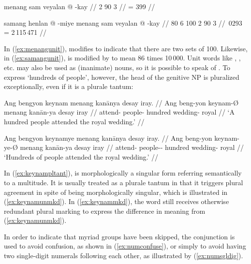 \pex[glwordalign=center]
\a\label{ex:menangunit}\begingl
	\gla menang sam veyalan @ -kay //
	 {2} {90} {3} //
	 = 399 //
\endgl

\a\label{ex:samangunit}\begingl
	\gla samang henlan @ -miye menang sam veyalan @ -kay //
	 {80} {6} {100} {2} {90} {3} //
	\,0293 = 2\,115\,471 //
\endgl

\xe

In (\ref{ex:menangunit}),  modifies  to 
indicate that there are two sets of 100. Likewise, in 
(\ref{ex:samangunit}),  is modified by 
 to mean 86 times 10\,000.
Unit words like , , etc. may also be 
used as (inanimate) nouns, so it is possible to speak of  
. To express `hundreds of people', however, 
the head of the genitive NP is pluralized exceptionally, even if it is a 
plurale tantum:

\pex\label{ex:keynampltant}
\a\label{ex:keynamunmkd}\begingl
	\gla Ang bengyon keynam menang kanānya {desay iray}. //
	\glb Ang beng-yon keynam-Ø menang kanān-ya {desay iray} //
	\glc \AgtT{} attend-\TplN{} people-\Top{} hundred wedding-\Loc{} 
		royal //
	\glft `A hundred people attended the royal wedding.' //
\endgl

\a\label{ex:keynammkd}\begingl
	\gla Ang bengyon keynamye menang kanānya {desay iray}. //
	\glb Ang beng-yon keynam-ye-Ø menang kanān-ya {desay iray} //
	\glc \AgtT{} attend-\TplN{} people-\Pl{}-\Top{} hundred wedding-\Loc{} 
		royal //
	\glft `Hundreds of people attended the royal wedding.' //
\endgl

\xe

In (\ref{ex:keynampltant}),  is morphologically a singular
form referring semantically to a multitude. It is usually treated as a plurale
tantum in that it triggers plural agreement in spite of being morphologically
singular, which is illustrated in (\ref{ex:keynamunmkd}). In
(\ref{ex:keynammkd}), the word still receives otherwise redundant plural
marking to express the difference in meaning from (\ref{ex:keynamunmkd}).

In order to indicate that myriad groups have been skipped, the conjunction
 is used to avoid confusion, as shown in
(\ref{ex:numconfuse}), or simply to avoid having two single-digit numerals
following each other, as illustrated by (\ref{ex:numsgldig}).


